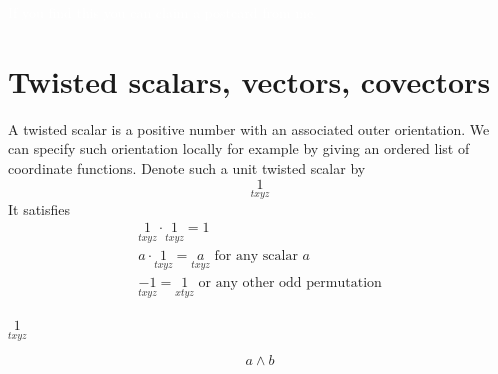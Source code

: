 \documentclass[\ifafour a4paper,12pt,\else a5paper,10pt,\fi%
onecolumn,oneside,article,%
british%
]{memoir}
\makeatletter
\theoremstyle{remark}
\theoremstyle{innote}
\def\sum{\DOTSI\sumop\slimits@}
\newcommand*{\de}{\partialup}%
\DeclareMathOperator{\tr}{tr}%
\newcommand*{\p}{\mathrm{p}}%
\renewcommand*{\|}[1][]{\nonscript\:#1\vert\nonscript\:\mathopen{}}
\newcommand*{\tsum}{\mathop{\textstyle\sum}\nolimits}
\newcommand*{\ts}[1][txyz]{\underset{#1}{1}}
\makeatother
\begin{document}
\textcolor{white}{If you find this you can claim a postcard from me.}



\section{Twisted scalars, vectors, covectors}
\label{sec:twisted}

A twisted scalar is a positive number with an associated outer orientation.
We can specify such orientation locally for example by giving an ordered
list of coordinate functions. Denote such a unit twisted scalar by
\begin{equation}
  \label{eq:twisted_scalar}
  \ts
\end{equation}
It satisfies
\begin{equation}
  \label{eq:twisted_scalar_properties}
  \begin{gathered}
    \ts \cdot \ts = 1
    \\
    a \cdot \ts = \underset{txyz}{a} \text{ for any scalar $a$}
    \\
    \underset{txyz}{-1} = \ts[xtyz] \text{ or any other odd permutation}
\end{gathered}
\end{equation}



$\ts$

$$a \land b$$




\end{document}
